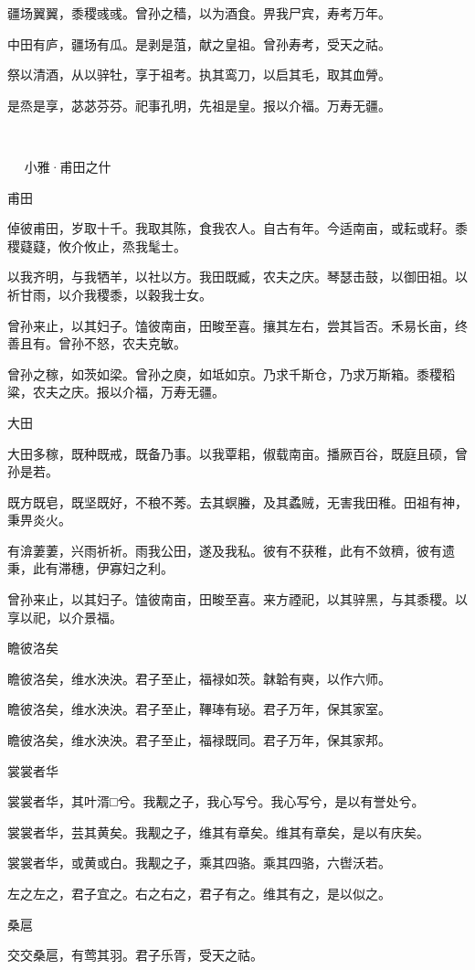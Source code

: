疆场翼翼，黍稷彧彧。曾孙之穑，以为酒食。畀我尸宾，寿考万年。

中田有庐，疆场有瓜。是剥是菹，献之皇祖。曾孙寿考，受天之祜。

祭以清酒，从以骍牡，享于祖考。执其鸾刀，以启其毛，取其血膋。

是烝是享，苾苾芬芬。祀事孔明，先祖是皇。报以介福。万寿无疆。

　

　
小雅·甫田之什


甫田 

倬彼甫田，岁取十千。我取其陈，食我农人。自古有年。今适南亩，或耘或耔。黍稷薿薿，攸介攸止，烝我髦士。

以我齐明，与我牺羊，以社以方。我田既臧，农夫之庆。琴瑟击鼓，以御田祖。以祈甘雨，以介我稷黍，以穀我士女。

曾孙来止，以其妇子。馌彼南亩，田畯至喜。攘其左右，尝其旨否。禾易长亩，终善且有。曾孙不怒，农夫克敏。

曾孙之稼，如茨如梁。曾孙之庾，如坻如京。乃求千斯仓，乃求万斯箱。黍稷稻粱，农夫之庆。报以介福，万寿无疆。

大田

大田多稼，既种既戒，既备乃事。以我覃耜，俶载南亩。播厥百谷，既庭且硕，曾孙是若。

既方既皂，既坚既好，不稂不莠。去其螟螣，及其蟊贼，无害我田稚。田祖有神，秉畀炎火。

有渰萋萋，兴雨祈祈。雨我公田，遂及我私。彼有不获稚，此有不敛穧，彼有遗秉，此有滞穗，伊寡妇之利。

曾孙来止，以其妇子。馌彼南亩，田畯至喜。来方禋祀，以其骍黑，与其黍稷。以享以祀，以介景福。

瞻彼洛矣

瞻彼洛矣，维水泱泱。君子至止，福禄如茨。韎韐有奭，以作六师。

瞻彼洛矣，维水泱泱。君子至止，鞸琫有珌。君子万年，保其家室。

瞻彼洛矣，维水泱泱。君子至止，福禄既同。君子万年，保其家邦。

裳裳者华

裳裳者华，其叶湑□兮。我觏之子，我心写兮。我心写兮，是以有誉处兮。

裳裳者华，芸其黄矣。我觏之子，维其有章矣。维其有章矣，是以有庆矣。

裳裳者华，或黄或白。我觏之子，乘其四骆。乘其四骆，六辔沃若。

左之左之，君子宜之。右之右之，君子有之。维其有之，是以似之。

桑扈

交交桑扈，有莺其羽。君子乐胥，受天之祜。

